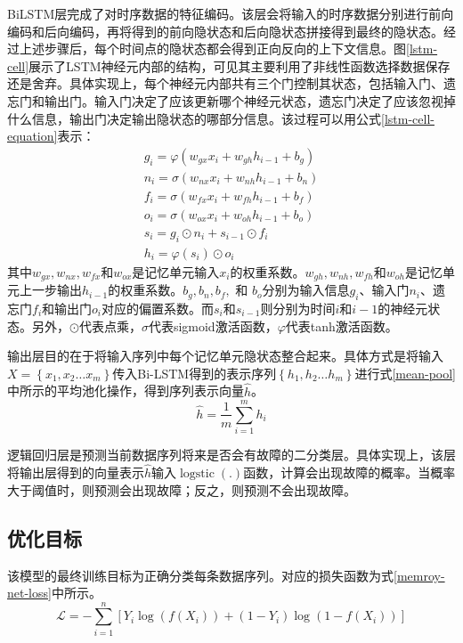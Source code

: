 BiLSTM层完成了对时序数据的特征编码。该层会将输入的时序数据分别进行前向编码和后向编码，再将得到的前向隐状态和后向隐状态拼接得到最终的隐状态。经过上述步骤后，每个时间点的隐状态都会得到正向反向的上下文信息。图\ref{lstm-cell}展示了LSTM神经元内部的结构，可见其主要利用了非线性函数选择数据保存还是舍弃。具体实现上，每个神经元内部共有三个门控制其状态，包括输入门、遗忘门和输出门。输入门决定了应该更新哪个神经元状态，遗忘门决定了应该忽视掉什么信息，输出门决定输出隐状态的哪部分信息。该过程可以用公式\ref{lstm-cell-equation}表示：
\begin{equation}
    \begin{array}{l}
    g_{i}=\varphi\left(w_{g x} x_{i}+w_{g h} h_{i - 1}+b_{g}\right) \\
    n_{i}=\sigma\left(w_{n x} x_{i}+w_{n h} h_{i- 1}+b_{n}\right) \\
    f_{i}=\sigma\left(w_{f x} x_{i}+w_{f h} h_{i- 1}+b_{f}\right) \\
    o_{i}=\sigma\left(w_{o x} x_{i}+w_{o h} h_{i- 1}+b_{o}\right) \\
    s_{i}=g_{i} \odot n_{i}+s_{i -1} \odot f_{i} \\
    h_{i}=\varphi\left(s_{i}\right) \odot o_{i}
    \end{array}
    \label{lstm-cell-equation}
\end{equation}
其中$w_{gx}, w_{nx}, w_{fx} $和$w_{ox} $是记忆单元输入$x_{i}$的权重系数。$w_{gh}, w_{nh}, w_{fh} $和$w_{oh} $是记忆单元上一步输出$h_{i-1}$的权重系数。$b_{g}, b_{n}, b_{f},$ 和 $b_{o}$分别为输入信息$g_{i}$、输入门$n_{i}$、遗忘门$f_{i}$和输出门$o_{i}$对应的偏置系数。而$s_{i}$和$s_{i-1}$则分别为时间$i$和$i-1$的神经元状态。另外，$\odot$代表点乘，$\sigma$代表sigmoid激活函数，$\varphi$代表tanh激活函数。

输出层目的在于将输入序列中每个记忆单元隐状态整合起来。具体方式是将输入$X=\left\{x_{1}, x_{2} \ldots x_{m}\right\}$传入Bi-LSTM得到的表示序列$\left\{h_{1}, h_{2} \ldots h_{m}\right\}$进行式\ref{mean-pool}中所示的平均池化操作，得到序列表示向量$\widehat{h}$。
\begin{equation}
    \widehat{h}=\frac{1}{m} \sum_{i=1}^{m} h_{i}
    \label{mean-pool}
\end{equation}

逻辑回归层是预测当前数据序列将来是否会有故障的二分类层。具体实现上，该层将输出层得到的向量表示$\widehat{h}$输入$\operatorname{logstic}(.)$函数，计算会出现故障的概率。当概率大于阈值时，则预测会出现故障；反之，则预测不会出现故障。

\subsection{优化目标}
该模型的最终训练目标为正确分类每条数据序列。对应的损失函数为式\ref{memroy-net-loss}中所示。
\begin{equation}
    \mathcal{L}=-\sum_{i=1}^{n}\left[Y_{i} \log \left(f\left(X_{i} \right)\right)+\left(1-Y_{i}\right) \log \left(1-f\left(X_{i} \right)\right)\right]
    \label{memroy-net-loss}
\end{equation}

